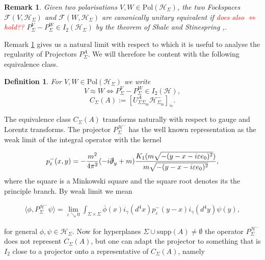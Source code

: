 \documentclass[a4paper,11pt]{article}
\newtheorem{de}{Definition}
\newtheorem{rmk}{Remark}
\begin{document}
\begin{rmk}\label{WhyUseApprox}
Given two polarisations \(V,W\in \text{Pol}(\mathcal{H}_\Sigma)\), the two Fockspaces \(\mathcal{F}(V,\mathcal{H}_\Sigma)\) and 
\(\mathcal{F}(W,\mathcal{H}_\Sigma)\) are canonically unitary equivalent if \textcolor{red}{does also \(\iff\)  hold??} 
\(P^V_\Sigma - P^W_\Sigma \in I_2(\mathcal{H}_\Sigma)\) by the theorem of Shale and Stinespring 
\cite{Shale Stinespring 1965},.
\end{rmk}
Remark \ref{WhyUseApprox} gives us a natural limit with 
respect to which it is useful
to analyse the regularity of Projectors \(P_\Sigma^A\). We will therefore be content with the following equivalence class.
\begin{de}
For \(V,W\in \text{Pol}(\mathcal{H}_\Sigma)\) we write
\begin{equation}
V\approx W \iff P^V_\Sigma - P^W_\Sigma \in I_2(\mathcal{H}),
\end{equation}
\begin{equation}
C_\Sigma (A):= [ U_{\Sigma \Sigma_{\text{in}}}^A \mathcal{H}_{\Sigma_{\text{in}}}^-]_\approx.
\end{equation}
\end{de}

The equivalence class \(C_\Sigma(A)\) transforms naturally with respect to gauge and Lorentz transforms\cite{ivp2}. 
The projector \(P^{\mathcal{H}^-}_{\Sigma} \) has the well known representation as the weak limit of the integral operator 
with the kernel\cite{ivp2}

\begin{equation}
p^-_\varepsilon(x,y)= -\frac{m^2}{4\pi^2}(-i\slashed{\partial}_y+m) \frac{K_1(m \sqrt{-(y-x-i\varepsilon e_0)^2})}{m \sqrt{-(y-x-i\varepsilon e_0)^2}},
\end{equation}
where the square is a Minkowski square and the square root denotes its the principle branch. By weak limit we mean

\begin{align}
\langle \phi, P^{\mathcal{H}^-}_{\Sigma} \psi\rangle = \lim_{\varepsilon \searrow 0} \int_{\Sigma\times \Sigma} \overline{\phi}(x) i_\gamma(d^4x) p^-_\varepsilon(y-x ) i_\gamma(d^4y) \psi(y),
\end{align}

for general \(\phi, \psi \in \mathcal{H}_\Sigma\).
Now for hyperplanes \(\Sigma\cup \text{supp}(A)\neq \emptyset\) the operator \(P^{\mathcal{H}^-}_{\Sigma} \) does not represent
\(C_\Sigma(A)\), but one can adapt the projector to something that is \(I_2\) 
close to a projector onto a representative of \(C_\Sigma(A)\), namely
\end{document}
